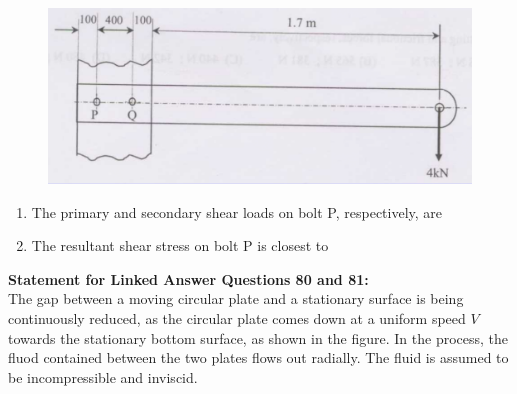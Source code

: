 \documentclass[journal,12pt,onecolumn]{IEEEtran}
\begin{document}
\begin{figure}[H]
    \centering
    \includegraphics[scale=0.3]{q78}
    \caption{}
    \label{q78}
\end{figure}
\begin{enumerate}[resume]
    \item The primary and secondary shear loads on bolt P, respectively, are
          \begin{enumerate}
          \end{enumerate}

    \item The resultant shear stress on bolt P is closest to
          \begin{enumerate}
          \end{enumerate}

\end{enumerate}
\normalsize\textbf{Statement for Linked Answer Questions 80 and 81:}\\
The gap between a moving circular plate and a stationary surface is being continuously reduced, as the circular plate comes down at a uniform speed $V$ towards the stationary bottom surface, as shown in the figure. In the process, the fluod contained between the two plates flows out radially. The fluid is assumed to be incompressible and inviscid.
\end{document}
